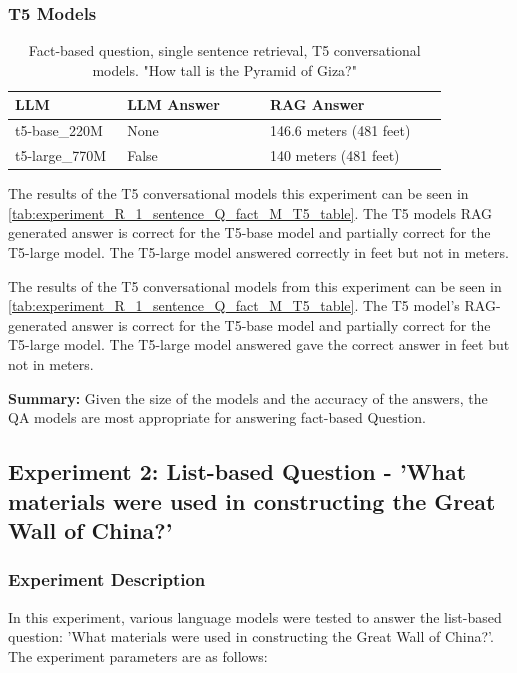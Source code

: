 \documentclass{wseas}
\begin{document}
\subsubsection{T5 Models}

\begin{table}[htbp]
  \centering
  \caption{Fact-based question, single sentence retrieval, T5 conversational models. "How tall is the Pyramid of Giza?"} %
  \label{tab:experiment_R_1_sentence_Q_fact_M_T5_table}  %
  \begin{tabular}{|p{0.22\linewidth}|p{0.29\linewidth}|p{0.35\linewidth}|}
    \hline
    \textbf{LLM} & \textbf{LLM Answer} & \textbf{RAG Answer} \\ \hline
    t5-base\_220M & None & 146.6 meters (481 feet) \\ \hline
    t5-large\_770M & False & 140 meters (481 feet) \\ \hline
  \end{tabular}
\end{table}

The results of the T5 conversational models this experiment can be seen in \autoref{tab:experiment_R_1_sentence_Q_fact_M_T5_table}.
The T5 models RAG generated answer is correct for the T5-base model and partially correct
for the T5-large model. The T5-large model answered correctly in feet but not in meters.

The results of the T5 conversational models from this experiment can be seen in \autoref{tab:experiment_R_1_sentence_Q_fact_M_T5_table}. 
The T5 model's RAG-generated answer is correct for the T5-base model and partially correct for the T5-large model. 
The T5-large model answered gave the correct answer in feet but not in meters.

\textbf{Summary:}
Given the size of the models and the accuracy of the answers, the QA models are most
appropriate for answering fact-based Question.


\subsection{Experiment 2: List-based Question - 'What materials were
used in constructing the Great Wall of China?'}

\subsubsection{Experiment Description}

In this experiment, various language models were tested to answer the
list-based question: 'What materials were used in constructing the
Great Wall of China?'. The experiment parameters are as follows:
\end{document}

